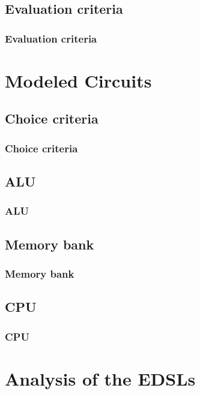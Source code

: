 \documentclass{beamer}
\begin{document}
        \subsection{Evaluation criteria}
        \label{subsec:evaluation-criteria}
            \begin{frame}
                \frametitle{Evaluation criteria}
            \end{frame}


    \section{Modeled Circuits}
    \label{sec:modeled-circuits}
        \frame{\sectionpage}

        \subsection{Choice criteria}
        \label{subsec:circuit-choice-criteria}
            \begin{frame}
                \frametitle{Choice criteria}
            \end{frame}

        \subsection{ALU}
        \label{subsec:alu}
            \begin{frame}
                \frametitle{ALU}
            \end{frame}

        \subsection{Memory bank}
        \label{subsec:memory-bank}
            \begin{frame}
                \frametitle{Memory bank}
            \end{frame}

        \subsection{CPU}
        \label{subsec:cpu}
            \begin{frame}
                \frametitle{CPU}
            \end{frame}


    \section{Analysis of the EDSLs}
    \label{sec:analysis-of-the-edsls}
        \frame{\sectionpage}
\end{document}
